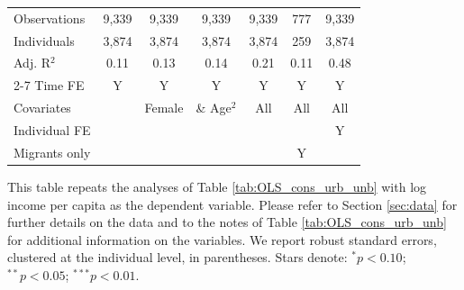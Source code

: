 \begin{table}[htbp]
\begin{threeparttable}
\begin{tabular}{l cccccc}
\addlinespace
Observations        &       9,339   &       9,339   &       9,339   &       9,339   &         777   &       9,339   \\
Individuals         &       3,874   &       3,874   &       3,874   &       3,874   &         259   &       3,874   \\
Adj. R$^{2}$        &        0.11   &        0.13   &        0.14   &        0.21   &        0.11   &        0.48   \\
\cmidrule{2-7} Time FE & Y & Y & Y & Y & Y & Y \\ Covariates & & Female & \& Age$^2$ & All & All & All \\ Individual FE & & & & & & Y \\ Migrants only & & & & & Y & \\ \bottomrule \end{tabular} \begin{tablenotes}[flushleft] \footnotesize \item{This table repeats the analyses of Table \ref{tab:OLS_cons_urb_unb} with log income per capita as the dependent variable. Please refer to Section \ref{sec:data} for further details on the data and to the notes of Table \ref{tab:OLS_cons_urb_unb} for additional information on the variables. We report robust standard errors, clustered at the individual level, in parentheses. Stars denote: $^{*} p<0.10$; $^{**} p<0.05$; $^{***} p<0.01$.} \end{tablenotes} \end{threeparttable} \end{table}

